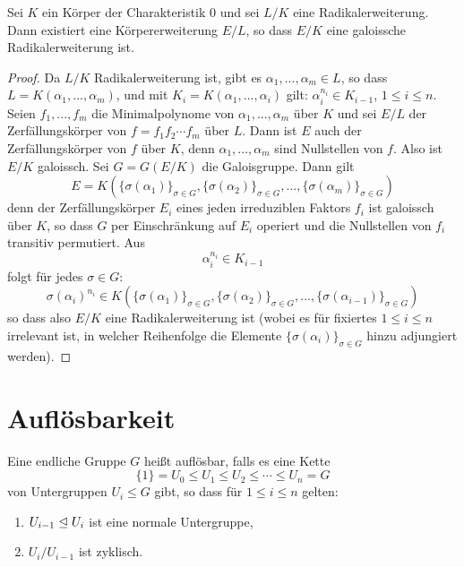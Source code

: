 \documentclass{book}
\begin{document}
\begin{lem}
    \label{lem:galoisradikal}
    Sei $K$ ein Körper der Charakteristik $0$ und sei $L/K$ eine
    Radikalerweiterung. Dann existiert eine Körpererweiterung $E/L$, so dass
    $E/K$ eine galoissche Radikalerweiterung ist. 
\end{lem}
\begin{proof}
    Da $L/K$ Radikalerweiterung ist, gibt es $\alpha_1, ..., \alpha_m \in L$,
    so dass $L = K(\alpha_1, ..., \alpha_m)$, und mit $K_i = K(\alpha_1,
    ..., \alpha_i)$ gilt: $\alpha_i^{n_i} \in K_{i-1}$, $1 \le i \le n$. Seien
    $f_1, ..., f_m$ die Minimalpolynome von $\alpha_1, ..., \alpha_m$ über $K$
    und sei $E/L$ der Zerfällungskörper von $f = f_1 f_2 \cdots f_m$ über $L$.
    Dann ist $E$ auch der Zerfällungskörper von $f$ über $K$, denn $\alpha_1,
    ..., \alpha_m$ sind Nullstellen von $f$. Also ist $E/K$ galoissch. Sei $G =
    G(E/K)$ die Galoisgruppe. Dann gilt
    \[
        E = K( \{\sigma(\alpha_1)\}_{\sigma \in G}, \{\sigma(\alpha_2)\}_{\sigma \in G}, ..., \{\sigma(\alpha_m)\}_{\sigma \in G} )
    \]
    denn der Zerfällungskörper $E_i$ eines jeden irreduziblen Faktors $f_i$ ist galoissch
    über $K$, so dass $G$ per Einschränkung auf $E_i$ operiert und die
    Nullstellen von $f_i$ transitiv permutiert. Aus 
    \[
        \alpha_i^{n_i} \in K_{i-1}
    \]
    folgt für jedes $\sigma \in G$: 
    \[
        \sigma(\alpha_i)^{n_i} \in K(\{\sigma(\alpha_1)\}_{\sigma \in G},
        \{\sigma(\alpha_2)\}_{\sigma \in G}, ...,
        \{\sigma(\alpha_{i-1})\}_{\sigma \in G})
    \]
    so dass also $E/K$ eine Radikalerweiterung ist (wobei es für
    fixiertes $1 \le i \le n$ irrelevant ist, in welcher Reihenfolge die
    Elemente $\{\sigma(\alpha_i)\}_{\sigma \in G}$ hinzu adjungiert werden). 
\end{proof}

\section{Auflösbarkeit}%
\label{sec:auflosbarkeit}

\begin{defi}
    \label{defi:auflösbar}
    Eine endliche Gruppe $G$ heißt auflösbar, falls es eine Kette 
    \begin{equation}\label{eq:kette}
        \{1\} = U_0 \le U_1  \le U_2 \le \cdots \le U_n = G
    \end{equation}
    von Untergruppen $U_i \le G$ gibt, so dass für $1 \le i \le n$ gelten:
    \begin{enumerate}
        \item $U_{i-1} \trianglelefteq U_i$ ist eine normale Untergruppe, 
        \item $U_i/U_{i-1}$ ist zyklisch. 
    \end{enumerate}
\end{defi}
\end{document}
